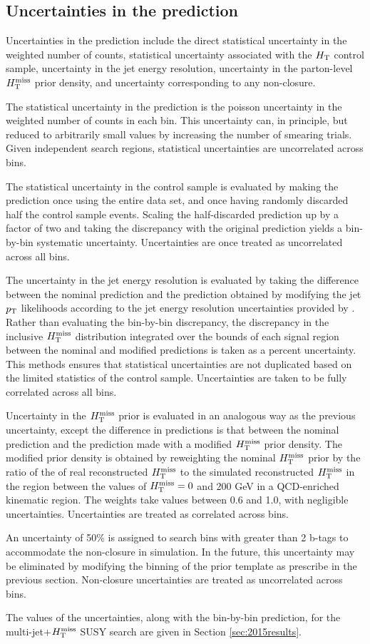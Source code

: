 \subsection{Uncertainties in the prediction}
Uncertainties in the prediction include the direct statistical uncertainty in the weighted number of counts, statistical uncertainty associated with the $H_{\rm T}$ control sample, uncertainty in the jet energy resolution, uncertainty in the parton-level $H_{\text{T}}^{\rm miss}$ prior density, and uncertainty corresponding to any non-closure. 

The statistical uncertainty in the prediction is the poisson uncertainty in the weighted number of counts in each bin. This uncertainty can, in principle, but reduced to arbitrarily small values by increasing the number of smearing trials. Given independent search regions, statistical uncertainties are uncorrelated across bins. 

The statistical uncertainty in the control sample is evaluated by making the prediction once using the entire data set, and once having randomly discarded half the control sample events. Scaling the half-discarded prediction up by a factor of two and taking the discrepancy with the original prediction yields a bin-by-bin systematic uncertainty. Uncertainties are once treated as uncorrelated across all bins.

The uncertainty in the jet energy resolution is evaluated by taking the difference between the nominal prediction and the prediction obtained by modifying the jet $p_{\text{T}}$ likelihoods according to the jet energy resolution uncertainties provided by  \cite{jetmet2}. Rather than evaluating the bin-by-bin discrepancy, the discrepancy in the inclusive $H_{\text{T}}^{\rm miss}$ distribution integrated over the bounds of each signal region between the nominal and modified predictions is taken as a percent uncertainty. This methods ensures that statistical uncertainties are not duplicated based on the limited statistics of the control sample. Uncertainties are taken to be fully correlated across all bins.

Uncertainty in the $H_{\text{T}}^{\rm miss}$ prior is evaluated in an analogous way as the previous uncertainty, except the difference in predictions is that between the nominal prediction and the prediction made with a modified $H_{\text{T}}^{\rm miss}$ prior density. The modified prior density is obtained by reweighting the nominal $H_{\text{T}}^{\rm miss}$ prior by the ratio of the of real reconstructed $H_{\text{T}}^{\rm miss}$ to the simulated reconstructed $H_{\text{T}}^{\rm miss}$ in the region between the values of $H_{\text{T}}^{\rm miss}=0$ and 200 GeV in a QCD-enriched kinematic region. The weights take values between 0.6 and 1.0, with negligible uncertainties. Uncertainties are treated as correlated across bins.

An uncertainty of 50\% is assigned to search bins with greater than 2 b-tags to accommodate the non-closure in simulation. In the future, this uncertainty may be eliminated by modifying the binning of the prior template as prescribe in the previous section. Non-closure uncertainties are treated as uncorrelated across bins. 

The values of the uncertainties, along with the bin-by-bin prediction, for the multi-jet$+$$H_{\text{T}}^{\rm miss}$ SUSY search are given in Section \ref{sec:2015results}.

